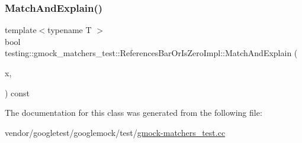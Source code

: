 \subsubsection{\texorpdfstring{Match\+And\+Explain()}{MatchAndExplain()}}
{\footnotesize\ttfamily template$<$typename T $>$ \\
bool testing\+::gmock\+\_\+matchers\+\_\+test\+::\+References\+Bar\+Or\+Is\+Zero\+Impl\+::\+Match\+And\+Explain (\begin{DoxyParamCaption}\item[{const T \&}]{x,  }\item[{\hyperlink{classtesting_1_1_match_result_listener}{Match\+Result\+Listener} $\ast$}]{ }\end{DoxyParamCaption}) const\hspace{0.3cm}{\ttfamily [inline]}}



The documentation for this class was generated from the following file\+:\begin{DoxyCompactItemize}
\item 
vendor/googletest/googlemock/test/\hyperlink{gmock-matchers__test_8cc}{gmock-\/matchers\+\_\+test.\+cc}\end{DoxyCompactItemize}

